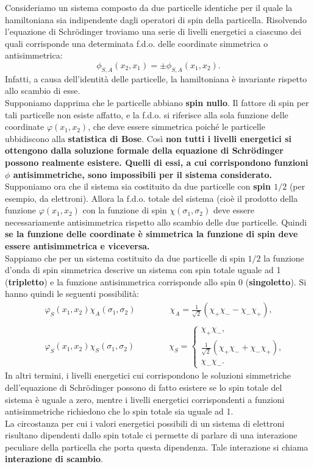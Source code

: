 Consideriamo un sistema composto da due particelle identiche per il quale la hamiltoniana sia indipendente dagli operatori di spin della particella. Risolvendo l'equazione di Schr\"{o}dinger troviamo una serie di livelli energetici a ciascuno dei quali corrisponde una determinata f.d.o. delle coordinate simmetrica o antisimmetrica:
\begin{equation}
\phi_{S,A}(x_2,x_1)= \pm \phi_{S,A}(x_1,x_2) .
\end{equation}
Infatti, a causa dell'identità delle particelle, la hamiltoniana è invariante rispetto allo scambio di esse.\\
Supponiamo dapprima che le particelle abbiano \textbf{spin nullo}. Il fattore di spin per tali particelle non esiste affatto, e la f.d.o. si riferisce alla sola funzione delle coordinate $\varphi(x_1, x_2)$, che deve essere simmetrica poiché le particelle ubbidiscono alla \textbf{statistica di Bose}. Così \textbf{non tutti i livelli energetici si ottengono dalla soluzione formale della equazione di Schr\"{o}dinger possono realmente esistere. Quelli di essi, a cui corrispondono funzioni $\phi$ antisimmetriche, sono impossibili per il sistema considerato.}\\
Supponiamo ora che il sistema sia costituito da due particelle con \textbf{spin $1/2$} (per esempio, da elettroni). Allora la f.d.o. totale del sistema (cioè il prodotto della funzione $\varphi(x_1,x_2)$ con la funzione di spin $\chi(\sigma_1, \sigma_2)$ deve essere necessariamente antisimmetrica rispetto allo scambio delle due particelle. Quindi \textbf{se la funzione delle coordinate è simmetrica la funzione di spin deve essere antisimmetrica e viceversa.}\\
Sappiamo che per un sistema costituito da due particelle di spin $1/2$ la funzione d'onda di spin simmetrica descrive un sistema con spin totale uguale ad 1 (\textbf{tripletto}) e la funzione antisimmetrica corrisponde allo spin 0 (\textbf{singoletto}). Si hanno quindi le seguenti possibilità:
\begin{eqnarray}
& &\varphi_S(x_1,x_2)\chi_A(\sigma_1,\sigma_2)\qquad \qquad \chi_A=\frac{1}{\sqrt{2}}(\chi_+\chi_--\chi_-\chi_+) , \\
\nonumber \\
& &\varphi_S(x_1,x_2)\chi_S(\sigma_1,\sigma_2)\qquad \qquad \chi_S=
\begin{cases}
\chi_+\chi_- , \\
\frac{1}{\sqrt{2}}(\chi_+\chi_-+\chi_-\chi_+), \\
\chi_-\chi_-.
\end{cases} 
\end{eqnarray}
In altri termini, i livelli energetici cui corrispondono le soluzioni simmetriche dell'equazione di Schr\"{o}dinger possono di fatto esistere se lo spin totale del sistema è uguale a zero, mentre i livelli energetici corrispondenti a funzioni antisimmetriche richiedono che lo spin totale sia uguale ad 1.\\
La circostanza per cui i valori energetici possibili di un sistema di elettroni risultano dipendenti dallo spin totale ci permette di parlare di una interazione peculiare della particella che porta questa dipendenza. Tale interazione si chiama \textbf{interazione di scambio}.